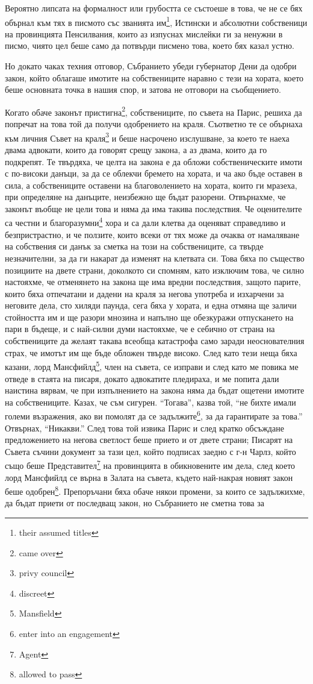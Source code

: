 \documentclass[12pt]{book}
\begin{document}
Вероятно липсата на формалност или грубостта се състоеше в това, че не се бях обърнал към тях в писмото със званията им\footnote{their assumed titles}, Истински и абсолютни собственици на провинцията Пенсилвания, които аз изпуснах мислейки ги за ненужни в писмо, чиято цел беше само да потвърди писмено това, което бях казал устно.

Но докато чаках техния отговор, Събранието убеди губернатор Дени да одобри закон, който облагаше имотите на собствениците наравно с тези на хората, което беше основната точка в нашия спор, и затова не отговори на съобщението. 

Когато обаче законът пристигна\footnote{came over}, собствениците, по съвета на Парис, решиха да попречат на това той да получи одобрението на краля. Съответно те се обърнаха към личния Съвет на краля\footnote{privy council} и беше насрочено изслушване, за което те наеха двама адвокати, които да говорят срещу закона, а аз двама, които да го подкрепят. Те твърдяха, че целта на закона е да обложи собственическите имоти с по-високи данъци, за да се облекчи бремето на хората, и ча ако бъде оставен в сила, а собствениците оставени на благоволението на хората, които ги мразеха, при определяне на данъците, неизбежно ще бъдат разорени. Отвърнахме, че законът въобще не цели това и няма да има такива последствия. Че оценителите са честни и благоразумни\footnote{discreet} хора и са дали клетва да оценяват справедливо и безпристрастно, и че ползите, които всеки от тях може да очаква от намаляване на собствения си данък за сметка на този на собствениците, са твърде незначителни, за да ги накарат да изменят на клетвата си. Това бяха по същество позициите на двете страни, доколкото си спомням, като изключим това, че силно настояхме, че отменянето на закона ще има вредни последствия, защото парите, които бяха отпечатани и дадени на краля за негова употреба и изхарчени за неговите дела, сто хиляди паунда, сега бяха у хората, и една отмяна ще заличи стойността им и ще разори мнозина и напълно ще обезкуражи отпускането на пари в бъдеще, и с най-силни думи настояхме, че е себично от страна на собствениците да желаят такава всеобща катастрофа само заради неоснователния страх, че имотът им ще бъде обложен твърде високо. След като тези неща бяха казани, лорд Мансфийлд\footnote{Mansfield}, член на съвета, се изправи и след като ме повика ме отведе в стаята на писаря, докато адвокатите пледираха, и ме попита дали наистина вярвам, че при изпълнението на закона няма да бъдат ощетени имотите на собствениците. Казах, че съм сигурен. “Тогава”, казва той, “не бихте имали големи възражения, ако ви помолят да се задължите\footnote{enter into an engagement}, за да гарантирате за това.” Отвърнах, “Никакви.” След това той извика Парис и след кратко обсъждане предложението на негова светлост беше прието и от двете страни; Писарят на Съвета съчини документ за тази цел, който подписах заедно с г-н Чарлз, който също беше Представител\footnote{Agent} на провинцията в обикновените им дела, след което лорд Мансфийлд се върна в Залата на съвета, където най-накрая новият закон беше одобрен\footnote{allowed to pass}. Препоръчани бяха обаче някои промени, за които се задължихме, да бъдат приети от последващ закон, но Събранието не сметна това за 
\end{document}
